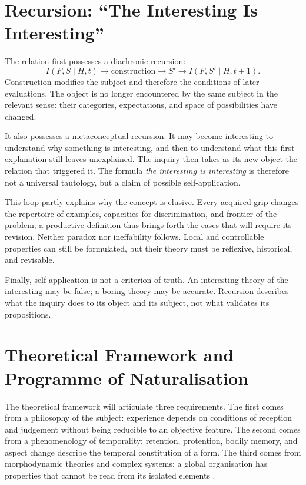 \documentclass[11pt,a4paper]{article}
\begin{document}
\section{Recursion: ``The Interesting Is Interesting''}

The relation first possesses a diachronic recursion:
\[
  I(F,S\mid H,t)\longrightarrow
  \text{construction}\longrightarrow S'
  \longrightarrow I(F,S'\mid H,t+1).
\]
Construction modifies the subject and therefore the conditions of later
evaluations. The object is no longer encountered by the same subject in the
relevant sense: their categories, expectations, and space of possibilities
have changed.

It also possesses a metaconceptual recursion. It may become interesting to
understand why something is interesting, and then to understand what this first
explanation still leaves unexplained. The inquiry then takes as its new object
the relation that triggered it. The formula \emph{the interesting is
interesting} is therefore not a universal tautology, but a claim of possible
self-application.

This loop partly explains why the concept is elusive. Every acquired grip
changes the repertoire of examples, capacities for discrimination, and frontier
of the problem; a productive definition thus brings forth the cases that will
require its revision. Neither paradox nor ineffability follows. Local and
controllable properties can still be formulated, but their theory must be
reflexive, historical, and revisable.

Finally, self-application is not a criterion of truth. An interesting theory of
the interesting may be false; a boring theory may be accurate. Recursion
describes what the inquiry does to its object and its subject, not what validates
its propositions.

\section{Theoretical Framework and Programme of Naturalisation}

The theoretical framework will articulate three requirements. The first comes
from a philosophy of the subject: experience depends on conditions of reception
and judgement without being reducible to an objective feature. The second comes
from a phenomenology of temporality: retention, protention, bodily memory, and
aspect change describe the temporal constitution of a form. The third comes
from morphodynamic theories and complex systems: a global organisation has
properties that cannot be read from its isolated elements
\parencite{petitot1993phenomenologie,petitot2002naturaliser}.
\end{document}
